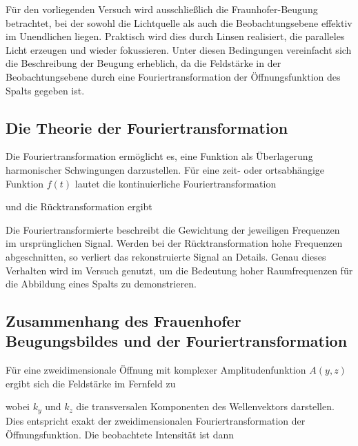 Für den vorliegenden Versuch wird ausschließlich die Fraunhofer-Beugung betrachtet, bei der sowohl die Lichtquelle als auch die Beobachtungsebene effektiv im Unendlichen liegen. Praktisch wird dies durch Linsen realisiert, die paralleles Licht erzeugen und wieder fokussieren. Unter diesen Bedingungen vereinfacht sich die Beschreibung der Beugung erheblich, da die Feldstärke in der Beobachtungsebene durch eine Fouriertransformation der Öffnungsfunktion des Spalts gegeben ist.


\subsection[Fouriertransformation]{Die Theorie der Fouriertransformation}

Die Fouriertransformation ermöglicht es, eine Funktion als Überlagerung harmonischer Schwingungen darzustellen. Für eine zeit- oder ortsabhängige Funktion \( f(t) \) lautet die kontinuierliche Fouriertransformation


und die Rücktransformation ergibt


Die Fouriertransformierte beschreibt die Gewichtung der jeweiligen Frequenzen im ursprünglichen Signal. Werden bei der Rücktransformation hohe Frequenzen abgeschnitten, so verliert das rekonstruierte Signal an Details. Genau dieses Verhalten wird im Versuch genutzt, um die Bedeutung hoher Raumfrequenzen für die Abbildung eines Spalts zu demonstrieren.

\subsection[Frauenhofer Beugung]{Zusammenhang des Frauenhofer Beugungsbildes und der Fouriertransformation}

Für eine zweidimensionale Öffnung mit komplexer Amplitudenfunktion \( A(y,z) \) ergibt sich die Feldstärke im Fernfeld zu


wobei \( k_y \) und \( k_z \) die transversalen Komponenten des Wellenvektors darstellen. Dies entspricht exakt der zweidimensionalen Fouriertransformation der Öffnungsfunktion. Die beobachtete Intensität ist dann

